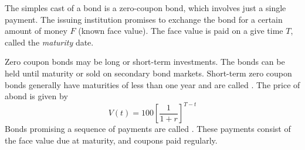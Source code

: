 \documentclass{article}
\begin{document}
\begin{definition}
  The simples cast of a bond is a zero-coupon bond, which involves just a single payment. The issuing institution promises to exchange the bond for a certain amount of money $F$ (known face value). The face value is paid on a give time $T$, called the \emph{maturity} date. 
\end{definition}
Zero coupon bonds may be long or short-term investments. The bonds can be held until maturity or sold on secondary bond markets. Short-term zero coupon bonds generally have maturities of less than one year and are called . The price of abond is given by $$V(t) = 100[\frac{1}{1+r}]^{T-t}$$ Bonds promising a sequence of payments are called . These payments consist of the face value due at maturity, and coupons paid regularly. 
\end{document}
